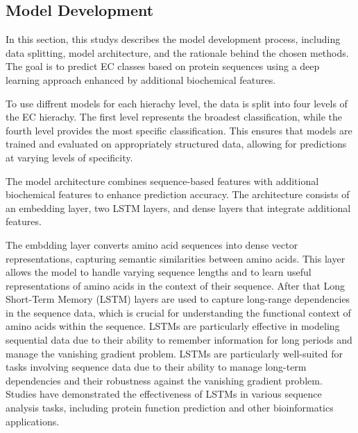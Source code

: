 \subsection{Model Development}
\label{sec:Model Development}

In this section, this studys describes the model development process, including data splitting, model architecture, and the rationale behind the chosen methods. The goal is to predict EC classes based on protein sequences using a deep learning approach enhanced by additional biochemical features.

To use diffrent models for each hierachy level, the data is split into four levels of the EC hierachy. The first level represents the broadest classification, while the fourth level provides the most specific classification. This ensures that models are trained and evaluated on appropriately structured data, allowing for predictions at varying levels of specificity.

The model architecture combines sequence-based features with additional biochemical features to enhance prediction accuracy. The architecture consists of an embedding layer, two LSTM layers, and dense layers that integrate additional features.

The embdding layer converts amino acid sequences into dense vector representations, capturing semantic similarities between amino acids. This layer allows the model to handle varying sequence lengths and to learn useful representations of amino acids in the context of their sequence. After that Long Short-Term Memory (LSTM) layers are used to capture long-range dependencies in the sequence data, which is crucial for understanding the functional context of amino acids within the sequence. LSTMs are particularly effective in modeling sequential data due to their ability to remember information for long periods and manage the vanishing gradient problem. LSTMs are particularly well-suited for tasks involving sequence data due to their ability to manage long-term dependencies and their robustness against the vanishing gradient problem. Studies have demonstrated the effectiveness of LSTMs in various sequence analysis tasks, including protein function prediction and other bioinformatics applications.\autocite{liuAttentionMechanismEnhanced2019} \autocite{zhangEncoderdecoderModelsSequencetosequence2023}

